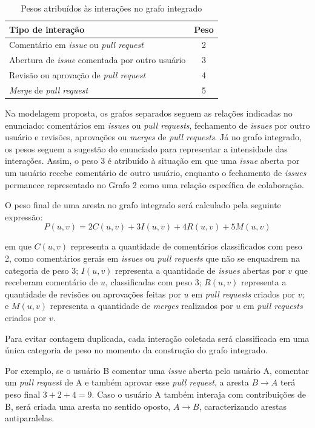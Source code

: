 \documentclass[12pt]{article}
\begin{document}
\begin{table}[htb]
\centering
\caption{Pesos atribuídos às interações no grafo integrado}
\label{tab:pesos_interacoes}
\begin{tabular}{|l|c|}
\hline
\textbf{Tipo de interação} & \textbf{Peso} \\ \hline
Comentário em \textit{issue} ou \textit{pull request} & 2 \\ \hline
Abertura de \textit{issue} comentada por outro usuário & 3 \\ \hline
Revisão ou aprovação de \textit{pull request} & 4 \\ \hline
\textit{Merge} de \textit{pull request} & 5 \\ \hline
\end{tabular}
\end{table}

Na modelagem proposta, os grafos separados seguem as relações indicadas no enunciado: comentários em \textit{issues} ou \textit{pull requests}, fechamento de \textit{issues} por outro usuário e revisões, aprovações ou \textit{merges} de \textit{pull requests}. Já no grafo integrado, os pesos seguem a sugestão do enunciado para representar a intensidade das interações. Assim, o peso 3 é atribuído à situação em que uma \textit{issue} aberta por um usuário recebe comentário de outro usuário, enquanto o fechamento de \textit{issues} permanece representado no Grafo 2 como uma relação específica de colaboração.

O peso final de uma aresta no grafo integrado será calculado pela seguinte expressão:
\[
P(u, v) = 2C(u, v) + 3I(u, v) + 4R(u, v) + 5M(u, v)
\]

em que \(C(u, v)\) representa a quantidade de comentários classificados com peso 2, como comentários gerais em \textit{issues} ou \textit{pull requests} que não se enquadrem na categoria de peso 3; \(I(u, v)\) representa a quantidade de \textit{issues} abertas por \(v\) que receberam comentário de \(u\), classificadas com peso 3; \(R(u, v)\) representa a quantidade de revisões ou aprovações feitas por \(u\) em \textit{pull requests} criados por \(v\); e \(M(u, v)\) representa a quantidade de \textit{merges} realizados por \(u\) em \textit{pull requests} criados por \(v\).

Para evitar contagem duplicada, cada interação coletada será classificada em uma única categoria de peso no momento da construção do grafo integrado.

Por exemplo, se o usuário B comentar uma \textit{issue} aberta pelo usuário A, comentar um \textit{pull request} de A e também aprovar esse \textit{pull request}, a aresta \(B \rightarrow A\) terá peso final \(3 + 2 + 4 = 9\). Caso o usuário A também interaja com contribuições de B, será criada uma aresta no sentido oposto, \(A \rightarrow B\), caracterizando arestas antiparalelas.
\end{document}
